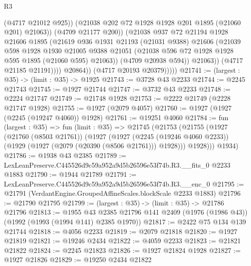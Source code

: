 \begin{lexlean}{R3}
\begin{coremodule}
                              (@4717 @21012 @925))
                            (@21038 @202 @72 @1928 @1928 @201 @1895 (@21060 @201) @21063))
                          (@4709 @21177 @200))
                        (@21038
                          @937
                          @72
                          @21194
                          @1928
                          @21606
                          @1895
                          (@21619
                            @936
                            @1931
                            @21193
                            (@21031 @9388)
                            @21606
                            (@21039
                              @598
                              @1928
                              @1930
                              @21005
                              @9388
                              @21051
                              (@21038 @596 @72 @1928 @1928 @595 @1895 (@21060 @595) @21063))
                            (@4709 @20938 @594))
                          @21063))
                      (@4717 @21185 @21191))))
                @20864))
            (@4717 @20193 @20379)))))
@21741 := (largest : @35) -> (limit : @35) -> @1925
@21743 := @3728 @43 @2233
@21744 := @2245 @21743
@21745 := @1927 @21744
@21747 := @3732 @43 @2233
@21748 := @2224 @21747
@21749 := @21748 @1928
@21753 := @2222 @21749 (@2228 @21747 @1928)
@21755 := @1927 (@2079 @4057)
@21760 := @1927 (@1927 (@2245 (@19247 @4060)) @1928)
@21761 := @19251 @4060
@21784 := fun (largest : @35) =>
  fun (limit : @35) =>
  @21745
    (@21753
      (@21755
        (@1927
          (@21760 (@8503 @21761))
          (@1927
            (@1927
              (@2245 (@19246 @4060 @2233))
              (@1929 (@1927 (@2079 (@20390 (@8506 @21761))) @1928)))
            @1928)))
      @1934)
@21786 := @1938 @43 @2385
@21789 := LexLeanPreserve.C445526d9c59a952a9d5b26596e53f74b.R3.__fits_0 @2233 @1883
@21790 := @1944 @21789
@21791 := LexLeanPreserve.C445526d9c59a952a9d5b26596e53f74b.R3.__enc_0
@21795 := @21791 (VerdantEngine.GroupedAffineScales.blockScale @2233 @1883)
@21796 := @21790 @21795
@21799 := (largest : @35) -> (limit : @35) -> @21786 @21796
@21813 := @1955
    @43
    @2385
    @21796
    @141
    @2409
    (@1976 (@1986 @43))
    (@1992 (@1993 (@1994 @141) @2385 @1970))
@21817 := @2422 @75 @134 @139 @21744
@21818 := @4056 @2233
@21819 := @2079 @21818
@21820 := @1927 @21819
@21821 := @19246 @2434
@21822 := @4059 @2233
@21823 := @21821 @21822
@21824 := @2245 @21823
@21826 := @1927 @21824 @1928
@21827 := @1927 @21826
@21829 := @19250 @2434 @21822

\end{coremodule}
\end{lexlean}
